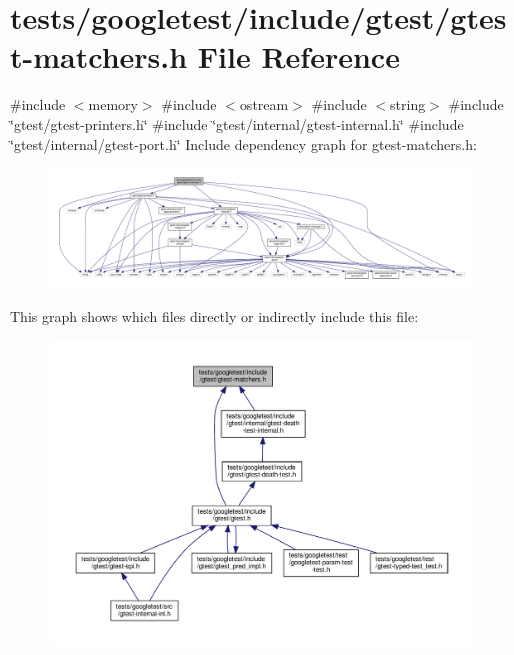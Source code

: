 \hypertarget{gtest-matchers_8h}{}\section{tests/googletest/include/gtest/gtest-\/matchers.h File Reference}
\label{gtest-matchers_8h}
{\ttfamily \#include $<$memory$>$}\newline
{\ttfamily \#include $<$ostream$>$}\newline
{\ttfamily \#include $<$string$>$}\newline
{\ttfamily \#include \char`\"{}gtest/gtest-\/printers.\+h\char`\"{}}\newline
{\ttfamily \#include \char`\"{}gtest/internal/gtest-\/internal.\+h\char`\"{}}\newline
{\ttfamily \#include \char`\"{}gtest/internal/gtest-\/port.\+h\char`\"{}}\newline
Include dependency graph for gtest-\/matchers.h\+:\nopagebreak
\begin{figure}[H]
\begin{center}
\leavevmode
\includegraphics[width=350pt]{gtest-matchers_8h__incl}
\end{center}
\end{figure}
This graph shows which files directly or indirectly include this file\+:\nopagebreak
\begin{figure}[H]
\begin{center}
\leavevmode
\includegraphics[width=350pt]{gtest-matchers_8h__dep__incl}
\end{center}
\end{figure}
